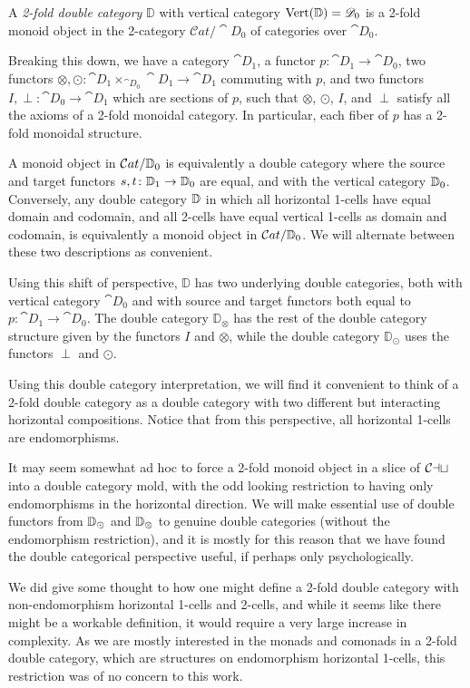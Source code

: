 \begin{definition}
	A \emph{2-fold double category} $\mathbb{D}$ with vertical category $\operatorname{Vert}(\mathbb{D})=\mathscr{D}_0$ is a 2-fold monoid object in the 2-category $\mathcal{C}at/\cat{D}_0$ of categories over $\cat{D}_0$.
\end{definition}

Breaking this down, we have a category $\cat{D}_1$, a functor $p\colon\cat{D}_1\to\cat{D}_0$, two functors $\otimes, \odot\colon \cat{D}_1\times_{\cat{D}_0}\cat{D}_1\to\cat{D}_1$ commuting with $p$, and two functors $I,\perp\colon\cat{D}_0\to\cat{D}_1$ which are sections of $p$, such that $\otimes$, $\odot$, $I$, and $\perp$ satisfy all the axioms of a 2-fold monoidal category. In particular, each fiber of $p$ has a 2-fold monoidal structure.

A monoid object in $\mathcal{C}at/\mathbb{D}_0$ is equivalently a double category where the source and target functors $s,t\colon \mathbb{D}_1\to \mathbb{D}_0$ are equal, and with the vertical category $\mathbb{D}_0$. Conversely, any double category $\mathbb{D}$ in which all horizontal 1-cells have equal domain and codomain, and all 2-cells have equal vertical 1-cells as domain and codomain, is equivalently a monoid object in $\mathcal{C}at/\mathbb{D}_0$. We will alternate between these two descriptions as convenient.

Using this shift of perspective, $\mathbb{D}$ has two underlying double categories, both with vertical category $\cat{D}_0$ and with source and target functors both equal to $p\colon\cat{D}_1\to\cat{D}_0$. The double category $\mathbb{D}_{\otimes}$ has the rest of the double category structure given by the functors $I$ and $\otimes$, while the double category $\mathbb{D}_{\odot}$ uses the functors $\perp$ and $\odot$.

Using this double category interpretation, we will find it convenient to think of a 2-fold double category as a double category with two different but interacting horizontal compositions. Notice that from this perspective, all horizontal 1-cells are endomorphisms.

\begin{remark}
	It may seem somewhat ad hoc to force a 2-fold monoid object in a slice of $\mathcal{Cat}$ into a double category mold, with the odd looking restriction to having only endomorphisms in the horizontal direction. We will make essential use of double functors from $\mathbb{D}_{\odot}$ and $\mathbb{D}_{\otimes}$ to genuine double categories (without the endomorphism restriction), and it is mostly for this reason that we have found the double categorical perspective useful, if perhaps only psychologically.

	We did give some thought to how one might define a 2-fold double category with non-endomorphism horizontal 1-cells and 2-cells, and while it seems like there might be a workable definition, it would require a very large increase in complexity. As we are mostly interested in the monads and comonads in a 2-fold double category, which are structures on endomorphism horizontal 1-cells, this restriction was of no concern to this work.
\end{remark}

